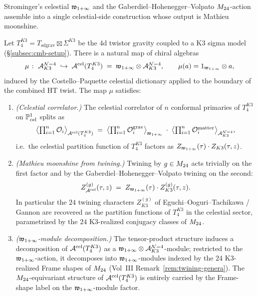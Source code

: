 Strominger's celestial $\mathfrak w_{1+\infty}$ and the Gaberdiel--Hohenegger--Volpato
$M_{24}$-action assemble into a single celestial-side construction whose
output is Mathieu moonshine.

\begin{theorem}
\label{thm:celestial-moonshine-bridge}
Let $T_4^{K3} = T_{\mathrm{sd grav}} \boxtimes \Sigma^{K3}$ be the 4d
twistor gravity coupled to a K3 sigma model
(\S\ref{subsec:cmb-setup}). There is a natural map of chiral algebras
\begin{equation}
\label{eq:cmb-bridge-map}
\mu
\;\colon\;
\mathcal A^{\mathcal{N}{=}4}_{K3}
\;\hookrightarrow\;
\mathcal A^{\mathrm{cel}}(T_4^{K3})
\;=\;
\mathfrak w_{1+\infty} \otimes \mathcal A^{\mathcal{N}{=}4}_{K3},
\qquad
\mu(a) = 1_{\mathfrak w_{1+\infty}} \otimes a,
\end{equation}
induced by the Costello--Paquette celestial dictionary applied to the
boundary of the combined HT twist. The map $\mu$ satisfies:
\begin{enumerate}[label=\textup{(\roman*)}]
\item \emph{(Celestial correlator.)}
The celestial correlator of $n$ conformal primaries of $T_4^{K3}$ on
$\mathbb P^1_{\mathrm{cel}}$ splits as
\[
\bigl\langle \textstyle\prod_{i=1}^n \mathcal O_i
\bigr\rangle_{\mathcal A^{\mathrm{cel}}(T_4^{K3})}
\;=\;
\bigl\langle \textstyle\prod_{i=1}^n \mathcal O_i^{\mathrm{grav}}
\bigr\rangle_{\mathfrak w_{1+\infty}}
\;\cdot\;
\bigl\langle \textstyle\prod_{i=1}^n \mathcal O_i^{\mathrm{matter}}
\bigr\rangle_{\mathcal A^{\mathcal{N}{=}4}_{K3}},
\]
i.e.\ the celestial partition function of $T_4^{K3}$ factors as
$Z_{\mathfrak w_{1+\infty}}(\tau) \cdot Z_{K3}(\tau, z)$.
\item \emph{(Mathieu moonshine from twining.)}
Twining by $g \in M_{24}$ acts trivially on the first factor and by
the Gaberdiel--Hohenegger--Volpato twining on the second:
\[
Z_{\mathcal A^{\mathrm{cel}}}^{(g)}(\tau, z)
\;=\;
Z_{\mathfrak w_{1+\infty}}(\tau) \cdot Z_{K3}^{(g)}(\tau, z).
\]
In particular the $24$ twining characters $Z_{K3}^{(g)}$ of
Eguchi--Ooguri--Tachikawa / Gannon are recovered as the partition
functions of $T_4^{K3}$ in the celestial sector, parametrized by the
$24$ K3-realized conjugacy classes of $M_{24}$.
\item \emph{($\mathfrak w_{1+\infty}$-module decomposition.)}
The tensor-product structure induces a decomposition of
$\mathcal A^{\mathrm{cel}}(T_4^{K3})$ as a $\mathfrak w_{1+\infty} \otimes \mathcal A^{\mathcal{N}{=}4}_{K3}$-module;
restricted to the $\mathfrak w_{1+\infty}$-action, it decomposes into $\mathfrak w_{1+\infty}$-modules
indexed by the $24$ K3-realized Frame shapes of $M_{24}$ (Vol~III
Remark~\ref{rem:twining-genera}). The $M_{24}$-equivariant structure
of $\mathcal A^{\mathrm{cel}}(T_4^{K3})$ is entirely carried by the Frame-shape label on
the $\mathfrak w_{1+\infty}$-module factor.
\end{enumerate}
\end{theorem}

